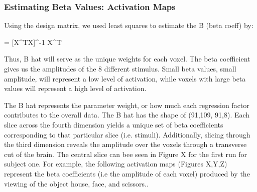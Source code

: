 \documentclass[12pt]{article}
\begin{document}
\subsubsection{Estimating Beta Values: Activation Maps}
Using the design matrix, we used least squares to estimate the B (beta coeff) by:

     \hat{\beta }= [X^{T}X]^{-1} X^{T}

Thus, B hat will serve as the unique weights for each voxel. The beta 
coefficient gives us the amplitudes of the 8 different stimulus. Small beta values, small amplitude,
will represent a low level of activation, while voxels with large beta values will
represent a high level of activation.

The B hat represents the parameter weight, or how much each regression factor 
contributes to the overall data. The B hat has the shape of (91,109, 91,8). 
Each slice across the fourth dimension yields a unique set of beta coefficients 
corresponding to that particular slice (i.e. stimuli). Additionally, slicing 
through the third dimension reveals the amplitude over the voxels through a 
transverse cut of the brain. The central slice can bee seen in Figure X for the 
first run for subject one.
For example, the following activation maps (Figures X,Y,Z) represent the beta 
coefficients (i.e the amplitude of each voxel) produced by the viewing of the 
object house, face, and scissors..
\end{document}
